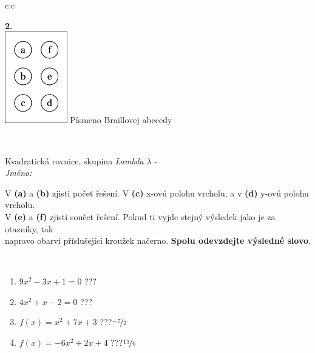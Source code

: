 \documentclass[10pt]{report}
\begin{document}
\begin{tabular}{c:c}
\begin{minipage}[c][104.5mm][t]{0.5\linewidth}
\begin{center}
\begin{minipage}{0.20\linewidth}
\begin{center}
{\Huge\bfseries 2.} \\[2mm]
\includegraphics[height=40mm]{../images/braille.png}
{\small Písmeno Braillovej abecedy}
\end{center}
\end{minipage}
\end{center}
\end{minipage}
\\ \hdashline
\begin{minipage}[c][104.5mm][t]{0.5\linewidth}
\begin{center}
\vspace{7mm}
{\huge Kvadratická rovnice, skupina \textit{Lambda $\lambda$} -}\\[5mm]
\textit{Jméno:}\phantom{xxxxxxxxxxxxxxxxxxxxxxxxxxxxxxxxxxxxxxxxxxxxxxxxxxxxxxxxxxxxxxxxx}\\[5mm]
\begin{minipage}{0.95\linewidth}
\begin{center}
V \textbf{(a)} a \textbf{(b)} zjisti počet řešení. V \textbf{(c)} x-ovú polohu vrcholu, a v \textbf{(d)} y-ovú polohu vrcholu.\\V \textbf{(e)} a \textbf{(f)} zjisti součet řešení. Pokud ti vyjde stejný výsledek jako je za otazníky, tak\\napravo obarvi příslušející kroužek načerno. \textbf{Spolu odevzdejte výsledné slovo}.
\end{center}
\end{minipage}
\\[1mm]
\begin{minipage}{0.79\linewidth}
\begin{center}
\begin{varwidth}{\linewidth}
\begin{enumerate}
\Large
\item $9x^2-3x+1=0$\quad \dotfill\; ???\;\dotfill {}
\item $4x^2+x-2=0$\quad \dotfill\; ???\;\dotfill {}
\item $f(x)=x^2+7x+3$\quad \dotfill\; ???\;\dotfill \quad $\nicefrac{-7}{2}$
\item $f(x)=-6x^2+2x+4$\quad \dotfill\; ???\;\dotfill \quad $\nicefrac{13}{6}$

\end{enumerate}
\end{varwidth}
\end{center}
\end{minipage}
\end{center}
\end{minipage}
\end{tabular}
\end{document}

